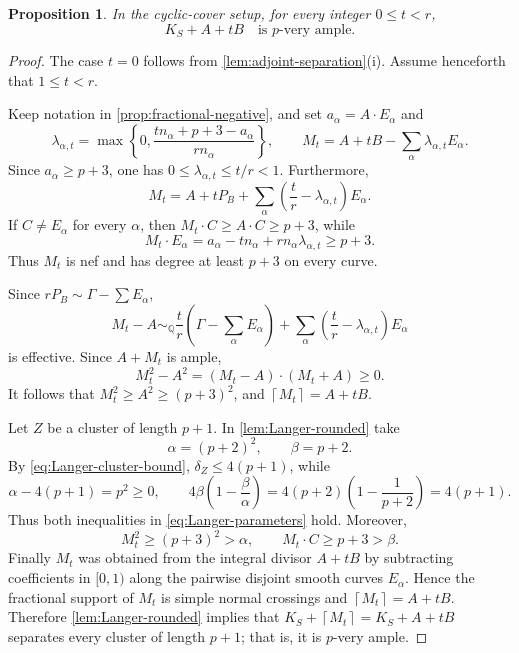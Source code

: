 \documentclass[11pt,reqno]{amsart}
\numberwithin{equation}{section}
\newtheorem{proposition}[proposition]{Proposition}
\theoremstyle{remark}
\newcommand{\ceil}[1]{\left\lceil #1\right\rceil}
\begin{document}
\begin{proposition}\label{prop:rounded-adjunction}
In the cyclic-cover setup, for every integer \(0\leq t<r\),
\begin{equation*}
  K_S+A+tB\quad\text{is \(p\)-very ample}.
\end{equation*}
\end{proposition}

\begin{proof}
The case \(t=0\) follows from
\cref{lem:adjoint-separation}\textup{(i)}.
Assume henceforth that \(1\leq t<r\).

Keep notation in \cref{prop:fractional-negative}, and
set \(a_\alpha=A\cdot E_\alpha\) and
\[
 \lambda_{\alpha,t}
 =\max\left\{0,\frac{tn_\alpha+p+3-a_\alpha}{rn_\alpha}\right\},
 \qquad
 M_t=A+tB-\sum_\alpha\lambda_{\alpha,t}E_\alpha.
\]
Since \(a_\alpha\geq p+3\), one has
\(0\leq\lambda_{\alpha,t}\leq t/r<1\). Furthermore,
\[
 M_t=A+tP_B+
 \sum_\alpha\left(\frac tr-\lambda_{\alpha,t}\right)E_\alpha.
\]
If \(C\neq E_\alpha\) for every \(\alpha\), then
\(M_t\cdot C\geq A\cdot C\geq p+3\), while
\[
 M_t\cdot E_\alpha
 =a_\alpha-tn_\alpha+rn_\alpha\lambda_{\alpha,t}\geq p+3.
\]
Thus \(M_t\) is nef and has degree at least \(p+3\) on every curve.

Since \(rP_B\sim\Gamma-\sum E_\alpha\),
\[
 M_t-A\sim_{\mathbb{Q}}
 \frac tr\left(\Gamma-\sum_\alpha E_\alpha\right)
 +\sum_\alpha\left(\frac tr-\lambda_{\alpha,t}\right)E_\alpha
\]
is effective. Since \(A+M_t\) is ample,
\[
 M_t^2-A^2=(M_t-A)\cdot(M_t+A)\geq0.
\]
It follows that \(M_t^2\geq A^2\geq (p+3)^2\), and
\(\ceil{M_t}=A+tB\).

Let \(Z\) be a cluster of length \(p+1\). In
\cref{lem:Langer-rounded} take
\[
 \alpha=(p+2)^2,\qquad \beta=p+2.
\]
By \eqref{eq:Langer-cluster-bound}, \(\delta_Z\leq4(p+1)\), while
\[
 \alpha-4(p+1)=p^2\geq0,
 \qquad
 4\beta\left(1-\frac{\beta}{\alpha}\right)
 =4(p+2)\left(1-\frac1{p+2}\right)=4(p+1).
\]
Thus both inequalities in \eqref{eq:Langer-parameters} hold. Moreover,
\[
 M_t^2\geq(p+3)^2>\alpha,
 \qquad M_t\cdot C\geq p+3>\beta.
\]
Finally \(M_t\) was obtained from the integral divisor \(A+tB\) by
subtracting coefficients in \([0,1)\) along the pairwise disjoint smooth
curves \(E_\alpha\). Hence the fractional support of $M_t$ is simple normal
crossings and \(\ceil{M_t}=A+tB\). Therefore \cref{lem:Langer-rounded} implies that \(K_S+\ceil{M_t}=K_S+A+tB\) separates every cluster of length \(p+1\); that is, it is $p$-very ample.
\end{proof}
\end{document}
